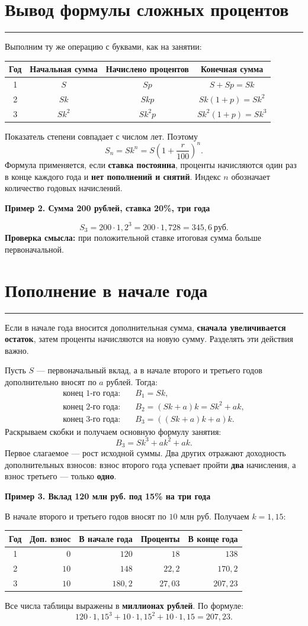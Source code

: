 \documentclass[a4paper,12pt]{article}
\newcommand{\lessonsection}[1]{\section{#1}\vspace{-0.2em}\noindent\textcolor{accent}{\rule{\linewidth}{0.55pt}}\vspace{0.2em}}
\newcommand{\exampletitle}[1]{\par\smallskip\noindent\textcolor{darkaccent}{\textbf{#1}}\par}
\begin{document}
\lessonsection{Вывод формулы сложных процентов}
Выполним ту же операцию с буквами, как на занятии:
\begin{center}
\renewcommand{\arraystretch}{1.30}
\begin{tabular}{@{}c c c c@{}}
\toprule
Год & Начальная сумма & Начислено процентов & Конечная сумма\\
\midrule
1 & $S$ & $Sp$ & $S+Sp=Sk$\\
2 & $Sk$ & $Skp$ & $Sk(1+p)=Sk^2$\\
3 & $Sk^2$ & $Sk^2p$ & $Sk^2(1+p)=Sk^3$\\
\bottomrule
\end{tabular}
\end{center}
Показатель степени совпадает с числом лет. Поэтому
\[
\boxed{\displaystyle S_n=Sk^n=S\left(1+\frac{r}{100}\right)^n.}
\]
Формула применяется, если \textbf{ставка постоянна}, проценты начисляются один раз в конце каждого года и \textbf{нет пополнений и снятий}. Индекс $n$ обозначает количество годовых начислений.

\exampletitle{Пример 2. Сумма 200 рублей, ставка 20\%, три года}
\[
S_3=200\cdot1{,}2^3=200\cdot1{,}728=345{,}6\ \text{руб.}
\]
\textcolor{darkaccent}{\textbf{Проверка смысла:}} при положительной ставке итоговая сумма больше первоначальной.

\lessonsection{Пополнение в начале года}
Если в начале года вносится дополнительная сумма, \textbf{сначала увеличивается остаток}, затем проценты начисляются на новую сумму. Разделять эти действия важно.

Пусть $S$ --- первоначальный вклад, а в начале второго и третьего годов дополнительно вносят по $a$ рублей. Тогда:
\[
\begin{aligned}
\text{конец 1-го года:}\quad&B_1=Sk,\\
\text{конец 2-го года:}\quad&B_2=(Sk+a)k=Sk^2+ak,\\
\text{конец 3-го года:}\quad&B_3=((Sk+a)k+a)k.
\end{aligned}
\]
Раскрываем скобки и получаем основную формулу занятия:
\[
\boxed{\displaystyle B_3=Sk^3+ak^2+ak.}
\]
Первое слагаемое --- рост исходной суммы. Два других отражают доходность дополнительных взносов: взнос второго года успевает пройти \textbf{два} начисления, а взнос третьего --- только \textbf{одно}.

\exampletitle{Пример 3. Вклад 120 млн руб. под 15\% на три года}
В начале второго и третьего годов вносят по $10$ млн руб. Получаем $k=1{,}15$:
\begin{center}
\renewcommand{\arraystretch}{1.23}
\begin{tabular}{@{}c r r r r@{}}
\toprule
Год & Доп. взнос & В начале года & Проценты & В конце года\\
\midrule
1 & $0$ & $120$ & $18$ & $138$\\
2 & $10$ & $148$ & $22{,}2$ & $170{,}2$\\
3 & $10$ & $180{,}2$ & $27{,}03$ & $207{,}23$\\
\bottomrule
\end{tabular}
\end{center}
\noindent\smallskip
Все числа таблицы выражены в \textbf{миллионах рублей}. По формуле:
\[
120\cdot1{,}15^3+10\cdot1{,}15^2+10\cdot1{,}15
=207{,}23.
\]
\end{document}
